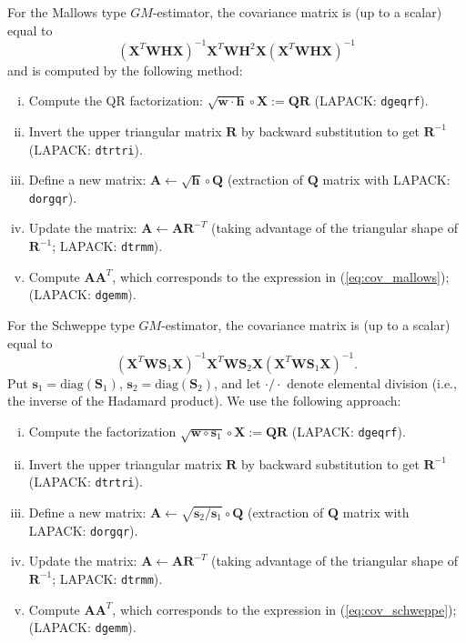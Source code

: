 \documentclass[a4paper,oneside,11pt,DIV=12]{scrartcl}
\newcommand{\code}[1]{{\texttt{#1}}}    %
\theoremstyle{remark}
\begin{document}
\noindent For the Mallows type $GM$-estimator, the covariance matrix is (up to a scalar) equal to
\begin{equation}\label{eq:cov_mallows}
   (\bm X^T \bm W \bm H \bm X)^{-1} \bm X^T \bm W \bm H^2 \bm X (\bm X^T \bm W \bm H \bm X)^{-1}
\end{equation}
\noindent and is computed by the following method:
\begin{enumerate}[i)]
   \item Compute the QR factorization: $\sqrt{\bm w \cdot \bm h} \circ \bm X := \bm Q \bm R$ (LAPACK: \code{dgeqrf}).
   \item Invert the upper triangular matrix $\bm R$ by backward substitution to get $\bm R^{-1}$ (LAPACK: \code{dtrtri}).
   \item Define a new matrix: $\bm A \leftarrow \sqrt{\bm h} \circ \bm Q$ (extraction of $\bm Q$ matrix with LAPACK: \code{dorgqr}).
   \item Update the matrix: $\bm A \leftarrow \bm A \bm R^{-T}$ (taking advantage of the triangular shape of $\bm R^{-1}$; LAPACK: \code{dtrmm}).
   \item Compute $\bm A \bm A^T$, which corresponds to the expression in (\ref{eq:cov_mallows}); (LAPACK: \code{dgemm}).
\end{enumerate}

\noindent For the Schweppe type $GM$-estimator, the covariance matrix is (up to a scalar) equal to
\begin{equation}\label{eq:cov_schweppe}
   (\bm X^T \bm W \bm S_1 \bm X)^{-1} \bm X^T \bm W \bm S_2 \bm X (\bm X^T \bm W \bm S_1 \bm X)^{-1}.
\end{equation}
\noindent Put $\bm s_1 = \mathrm{diag}(\bm S_1)$, $\bm s_2 = \mathrm{diag}(\bm S_2)$, and let $\cdot / \cdot $ denote elemental division (i.e., the inverse of the Hadamard product). We use the following approach:
\begin{enumerate}[i)]
   \item Compute the factorization $\sqrt{\bm w \circ \bm s_1} \circ \bm X := \bm Q \bm R$ (LAPACK: \code{dgeqrf}).
   \item Invert the upper triangular matrix $\bm R$ by backward substitution to get $\bm R^{-1}$ (LAPACK: \code{dtrtri}).
   \item Define a new matrix: $\bm A \leftarrow \sqrt{\bm s_2 / \bm s_1 } \circ \bm Q$ (extraction of $\bm Q$ matrix with LAPACK: \code{dorgqr}).
   \item Update the matrix: $\bm A \leftarrow \bm A \bm R^{-T}$ (taking advantage of the triangular shape of $\bm R^{-1}$; LAPACK: \code{dtrmm}).
   \item Compute $\bm A \bm A^T$, which corresponds to the expression in (\ref{eq:cov_schweppe}); (LAPACK: \code{dgemm}).
\end{enumerate}
\end{document}
